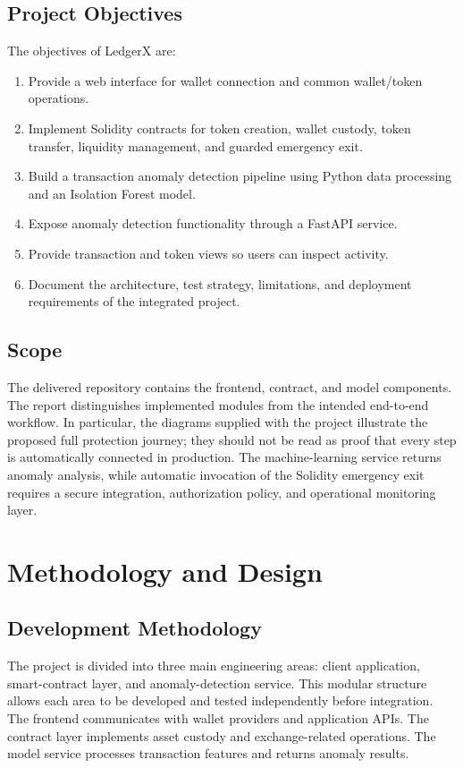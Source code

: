 \documentclass{tietreport}
\begin{document}
\section{Project Objectives}
The objectives of LedgerX are:
\begin{enumerate}
  \item Provide a web interface for wallet connection and common wallet/token
  operations.
  \item Implement Solidity contracts for token creation, wallet custody,
  token transfer, liquidity management, and guarded emergency exit.
  \item Build a transaction anomaly detection pipeline using Python data
  processing and an Isolation Forest model.
  \item Expose anomaly detection functionality through a FastAPI service.
  \item Provide transaction and token views so users can inspect activity.
  \item Document the architecture, test strategy, limitations, and deployment
  requirements of the integrated project.
\end{enumerate}

\section{Scope}
The delivered repository contains the frontend, contract, and model components.
The report distinguishes implemented modules from the intended end-to-end
workflow. In particular, the diagrams supplied with the project illustrate the
proposed full protection journey; they should not be read as proof that every
step is automatically connected in production. The machine-learning service
returns anomaly analysis, while automatic invocation of the Solidity emergency
exit requires a secure integration, authorization policy, and operational
monitoring layer.

\chapter{Methodology and Design}

\section{Development Methodology}
The project is divided into three main engineering areas: client application,
smart-contract layer, and anomaly-detection service. This modular structure
allows each area to be developed and tested independently before integration.
The frontend communicates with wallet providers and application APIs. The
contract layer implements asset custody and exchange-related operations.
The model service processes transaction features and returns anomaly results.
\end{document}
